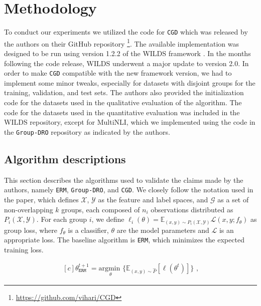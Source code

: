 \section{Methodology}

To conduct our experiments we utilized the code for \texttt{CGD} which was released by the authors on their GitHub repository \footnote{\url{https://github.com/vihari/CGD}}. The available implementation was designed to be run using version 1.2.2 of the WILDS framework \cite{koh2021wilds}. In the months following the code release, WILDS underwent a major update \cite{sagawa2021extending} to version 2.0. In order to make \texttt{CGD} compatible with the new framework version, we had to implement some minor tweaks, especially for datasets with disjoint groups for the training, validation, and test sets. The authors also provided the initialization code for the datasets used in the qualitative evaluation of the algorithm. The code for the datasets used in the quantitative evaluation was included in the WILDS repository, except for MultiNLI, which we implemented using the code in the \texttt{Group-DRO} repository \cite{sagawa2020distributionally} as indicated by the authors.


\subsection{Algorithm descriptions}

This section describes the algorithms used to validate the claims made by the authors, namely \texttt{ERM}, \texttt{Group-DRO}, and \texttt{CGD}. We closely follow the notation used in the paper, which defines $\mathcal{X}$, $\mathcal{Y}$ as the feature and label spaces, and $\mathcal{G}$ as a set of non-overlapping $k$ groups, each composed of $n_i$ observations distributed as $P_i(\mathcal{X}, \mathcal{Y})$. For each group $i$, we define $\ell_i(\theta) = \mathbb{E}_{(x, y)\sim P_i(\mathcal{X}, \mathcal{Y})}\mathcal{L}(x, y; f_\theta)$ as group loss, where $f_\theta$ is a classifier, $\theta$ are the model parameters and $\mathcal{L}$ is an appropriate loss. The baseline algorithm is \texttt{ERM}, which minimizes the expected training loss.

\begin{equation}
\begin{aligned}[c]
\theta^{t+1}_{\texttt{ERM}} = \underset{\theta}{\text{argmin }} \{\mathbb{E}_{(x, y)\sim \hat{P}}[\ell(\theta^t)]\} \text{ ,}
\end{aligned}
\label{eq:ERM_algo}
\end{equation}


